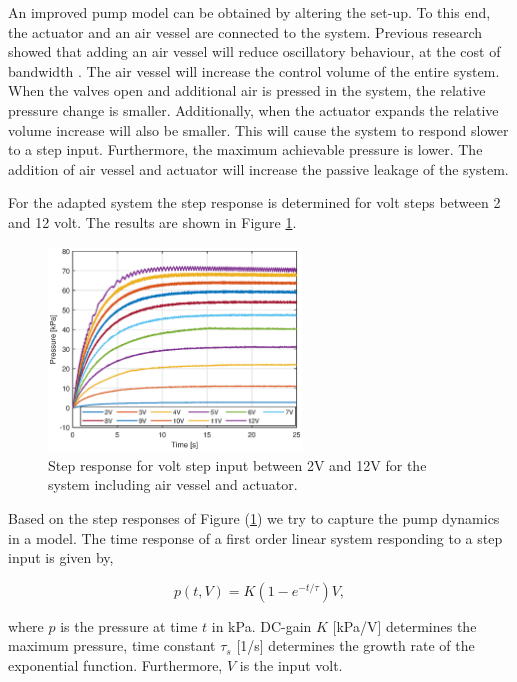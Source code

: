 An improved pump model can be obtained by altering the set-up. To this end, the actuator and an air vessel are connected to the system. Previous research showed that adding an air vessel will reduce oscillatory behaviour, at the cost of bandwidth \cite{proper}. The air vessel will increase the control volume of the entire system. When the valves open and additional air is pressed in the system, the relative pressure change is smaller. Additionally, when the actuator expands the relative volume increase will also be smaller. This will cause the system to respond slower to a step input. Furthermore, the maximum achievable pressure is lower. The addition of air vessel and actuator will increase the passive leakage of the system.

For the adapted system the step response is determined for volt steps between 2 and 12 volt. The results are shown in Figure \ref{fig3:pump_dynamics_adapted}.

\begin{figure}[H]
    \centering
    \includegraphics[width = 0.6\textwidth]{Figures/Chapter3/step212V.eps}
    \caption{Step response for volt step input between 2V and 12V for the system including air vessel and actuator.}
    \label{fig3:pump_dynamics_adapted}
\end{figure}


Based on the step responses of Figure (\ref{fig3:pump_dynamics_adapted}) we try to capture the pump dynamics in a model. The time response of a first order linear system responding to a step input is given by, 

\begin{equation}
    p(t,V) = K(1-e^{-t/\tau})V,
    \label{eq3:firstordermodel}
\end{equation}

where $p$ is the pressure at time $t$ in kPa. DC-gain $K$ [kPa/V] determines the maximum pressure, time constant $\tau_s$ [1/s] determines the growth rate of the exponential function. Furthermore, $V$ is the input volt. 

